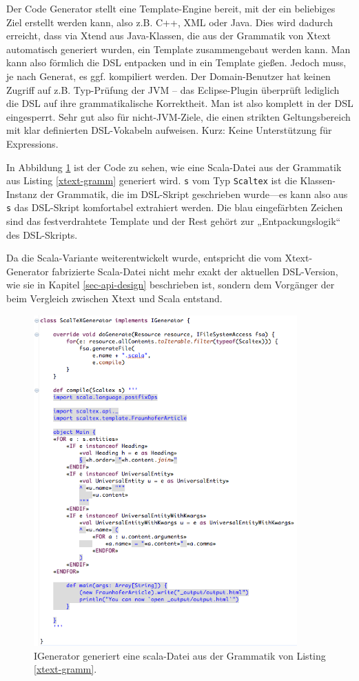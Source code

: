 Der Code Generator stellt eine Template-Engine bereit, mit der
ein beliebiges Ziel erstellt werden kann, also z.B. C++, XML oder Java.
Dies wird dadurch erreicht, dass via Xtend aus Java-Klassen, die aus der
Grammatik von Xtext automatisch generiert wurden, ein Template zusammengebaut
werden kann. Man kann also förmlich die DSL entpacken und in ein Template
gießen.
Jedoch muss, je nach Generat, es ggf. kompiliert werden. Der
Domain-Benutzer hat keinen Zugriff auf z.B. Typ-Prüfung der JVM --
das Eclipse-Plugin überprüft lediglich die DSL auf ihre
grammatikalische Korrektheit. Man ist also komplett in der DSL eingesperrt.
Sehr gut also für nicht-JVM-Ziele, die einen strikten Geltungsbereich mit
klar definierten DSL-Vokabeln aufweisen. Kurz: Keine Unterstützung für
Expressions.\cite{xtext}

In Abbildung \ref{fig-igenerator} ist der Code zu sehen, wie eine
Scala-Datei aus der Grammatik aus Listing \ref{xtext-gramm} generiert wird.
\verb+s+ vom Typ \verb+Scaltex+ ist die Klassen-Instanz der Grammatik,
die im DSL-Skript geschrieben wurde---es kann also aus \verb+s+ das DSL-Skript
komfortabel extrahiert werden. Die blau eingefärbten Zeichen sind
das festverdrahtete Template und der Rest gehört zur
„Entpackungslogik“ des DSL-Skripts.

Da die Scala-Variante weiterentwickelt wurde, entspricht
die vom Xtext-Gen\-erator fabrizierte Scala-Datei nicht mehr exakt der
aktuellen DSL-Version, wie sie in Kapitel \ref{sec-api-design} beschrieben ist,
sondern dem Vorgänger der beim Vergleich zwischen Xtext und Scala
entstand.

\begin{figure}[h!]
  \centering
    \includegraphics[width=0.9\textwidth]{figures/igenerator.png}
  \caption{IGenerator generiert eine scala-Datei aus der Grammatik von Listing \ref{xtext-gramm}.}\label{fig-igenerator}
\end{figure}

